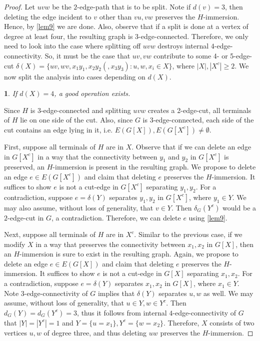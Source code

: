 \documentclass[letterpaper,11pt]{article}
\newtheorem{claim}{}[theorem]
\theoremstyle{definition}
\begin{document}
\begin{proof}
Let $uvw$ be the $2$-edge-path that is to be split. Note if $d(v)=3$, then deleting the edge incident to $v$ other than $vu,vw$ preserves the $H$-immersion. Hence, by \cref{lem9} we are done. Also, observe that if a split is done at a vertex of degree at least four, the resulting graph is $3$-edge-connected. Therefore, we only need to look into the case where splitting off $uvw$ destroys internal $4$-edge-connectivity. So, it must be the case that $uv, vw$ contribute to some 4- or 5-edge-cut $\delta (X)=\{ uv, wv, x_1y_1, x_2y_2 (, x_3y_3): u, w, x_i \in X \}$, where $|X|,|X^c|\ge 2$. We now split the analysis into cases depending on $d(X)$.
\begin{claim}
\label{splitdX4}
If $d(X)=4$, a good operation exists.
\end{claim}
Since $H$ is $3$-edge-connected and splitting $uvw$ creates a 2-edge-cut, all terminals of $H$ lie on one side of the cut. Also, since $G$ is $3$-edge-connected, each side of the cut contains an edge lying in it, i.e. $E(G[X]), E(G[X^c])\neq \emptyset$.

First, suppose all terminals of $H$ are in $X$. Observe that if we can delete an edge in $G[X^c]$ in a way that  the connectivity between $y_1$ and $y_2$ in $G[X^c]$ is preserved, an $H$-immersion is present in the resulting graph. We propose to delete an edge $e \in E(G[X^c])$ and claim that deleting $e$ preserves the $H$-immersion. It suffices to show $e$ is not a cut-edge in $G[X^c]$ separating $y_1, y_2$. For a contradiction, suppose $e=\delta(Y)$ separates $y_1,y_2$ in $G[X^c]$, where $y_1\in Y$. We may also assume, without loss of generality, that $v \in Y$. Then $\delta_G(Y^c)$ would be a $2$-edge-cut in $G$, a contradiction. Therefore, we can delete $e$ using \cref{lem9}.

Next, suppose all terminals of $H$ are in $X^c$. Similar to the previous case, if we modify $X$ in a way that preserves the connectivity between $x_1, x_2$ in $G[X]$, then an $H$-immersion is sure to exist in the resulting graph. Again, we propose to delete an edge $e \in E(G[X])$ and claim that deleting $e$ preserves the $H$-immersion. It suffices to show $e$ is not a cut-edge in $G[X]$ separating $x_1, x_2$. For a contradiction, suppose $e=\delta(Y)$ separates $x_1,x_2$ in $G[X]$, where $x_1\in Y$. Note $3$-edge-connectivity of $G$ implies that $\delta(Y)$ separates $u, w$ as well. We may assume, without loss of generality, that $u\in Y, w\in Y^c$. Then $d_G(Y)=d_G(Y^c)=3$, thus it follows from internal $4$-edge-connectivity of $G$ that $|Y|=|Y^c|=1$ and $Y=\{u=x_1\}, Y^c=\{w=x_2\}$. Therefore, $X$ consists of two vertices $u,w$ of degree three, and thus deleting $uw$ preserves the $H$-immersion.


\end{proof}
\end{document}
